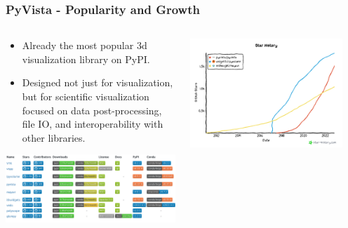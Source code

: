 \documentclass[t]{beamer}
\begin{document}
\begin{frame}
  \frametitle{PyVista - Popularity and Growth}

  \vspace{-15pt}

  \begin{center}
    \begin{columns}[T]
      \begin{column}{.5\textwidth}
        \small
        \begin{itemize}
          \item Already the most popular 3d visualization library on PyPI.
          \item Designed not just for visualization, but for scientific
            visualization focused on data post-processing, file IO, and
            interoperability with other libraries.
        \end{itemize}
        \vspace{10pt}
        \href{https://pyviz.org/tools.html}{\includegraphics[width=1.1\textwidth]{figures/overview_sciviz.png}}
      \end{column}

      \begin{column}{.5\textwidth}
        \vspace{-5pt}
        \centering
        \includegraphics[width=0.9\textwidth]{figures/overview-graph.png}
      \end{column}
    \end{columns}
  \end{center}  

\end{frame}
\end{document}
